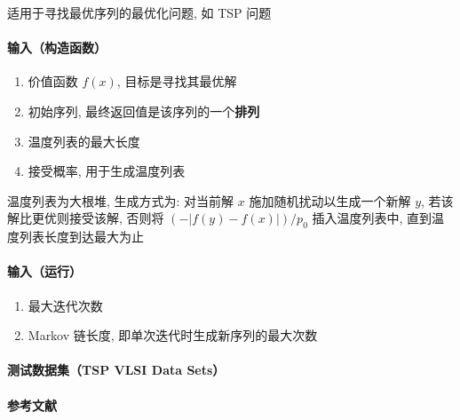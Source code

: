 适用于寻找最优序列的最优化问题, 如 TSP 问题

\paragraph{输入（构造函数）}

\begin{enumerate}
    \item[\verb|f|] 价值函数 \(f(x)\), 目标是寻找其最优解
    \item[\verb|x|] 初始序列, 最终返回值是该序列的一个\textbf{排列}
    \item[\verb|L|] 温度列表的最大长度
    \item[\verb|p0|] 接受概率, 用于生成温度列表
\end{enumerate}

温度列表为大根堆, 生成方式为: 对当前解 \(x\) 施加随机扰动以生成一个新解 \(y\), 若该解比更优则接受该解, 否则将 \((-|f(y)-f(x)|)/p_0\) 插入温度列表中, 直到温度列表长度到达最大为止

\paragraph{输入（运行）}

\begin{enumerate}
    \item[\verb|K|] 最大迭代次数
    \item[\verb|M|] Markov 链长度, 即单次迭代时生成新序列的最大次数
\end{enumerate}

\paragraph{测试数据集（TSP VLSI Data Sets）} \cite{tspvlsidatasets}

\paragraph{参考文献} \cite{zhan2016list}
